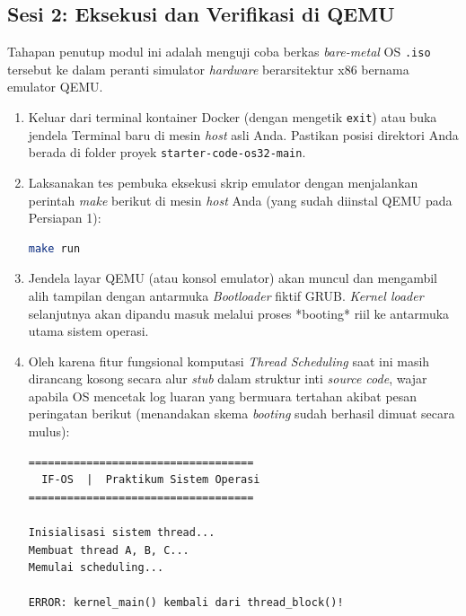 \subsection{Sesi 2: Eksekusi dan Verifikasi di QEMU}
\label{sec:m07-sesi-2}
Tahapan penutup modul ini adalah menguji coba berkas \textit{bare-metal} OS \texttt{.iso} tersebut ke dalam peranti simulator \textit{hardware} berarsitektur x86 bernama emulator QEMU.
\begin{enumerate}
    \item Keluar dari terminal kontainer Docker (dengan mengetik \texttt{exit}) atau buka jendela Terminal baru di mesin \textit{host} asli Anda. Pastikan posisi direktori Anda berada di folder proyek \texttt{starter-code-os32-main}.
    \item Laksanakan tes pembuka eksekusi skrip emulator dengan menjalankan perintah \textit{make} berikut di mesin \textit{host} Anda (yang sudah diinstal QEMU pada Persiapan 1):
    \begin{lstlisting}[language=bash, caption={Perintah memacu virtualisasi QEMU meluncurkan file OS biner}]
make run
    \end{lstlisting}

    \item Jendela layar QEMU (atau konsol emulator) akan muncul dan mengambil alih tampilan dengan antarmuka \textit{Bootloader} fiktif GRUB. \textit{Kernel loader} selanjutnya akan dipandu masuk melalui proses *booting* riil ke antarmuka utama sistem operasi.
    
    \item Oleh karena fitur fungsional komputasi \textit{Thread Scheduling} saat ini masih dirancang kosong secara alur \textit{stub} dalam struktur inti \textit{source code}, wajar apabila OS mencetak log luaran yang bermuara tertahan akibat pesan peringatan berikut (menandakan skema \textit{booting} sudah berhasil dimuat secara mulus):
    \begin{lstlisting}[caption={Pesan luaran *Thread block* sebagai bukti akhir keberhasilan simulasi di QEMU}]
===================================
  IF-OS  |  Praktikum Sistem Operasi
===================================

Inisialisasi sistem thread...
Membuat thread A, B, C...
Memulai scheduling...

ERROR: kernel_main() kembali dari thread_block()!
    \end{lstlisting}
\end{enumerate}
